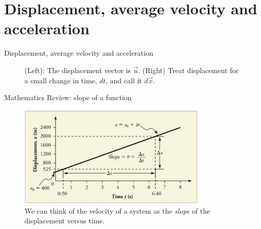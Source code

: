 \documentclass{beamer}
\begin{document}
\section{Displacement, average velocity and acceleration}

\begin{frame}{Displacement, average velocity and acceleration}
\begin{figure}
\centering
{}
\caption{\label{fig:displacement} (Left): The displacement vector is $\vec{u}$.  (Right) Treat displacement for a small change in time, $dt$, and call it $d\vec{x}$.}
\end{figure}
\end{frame}

\begin{frame}{Mathematics Review: slope of a function}
\begin{figure}
\includegraphics[width=0.8\textwidth]{figures/slope.png}
\caption{\label{fig:slope} We can think of the velocity of a system as the \textit{slope} of the displacement versus time.}
\end{figure}
\end{frame}
\end{document}

